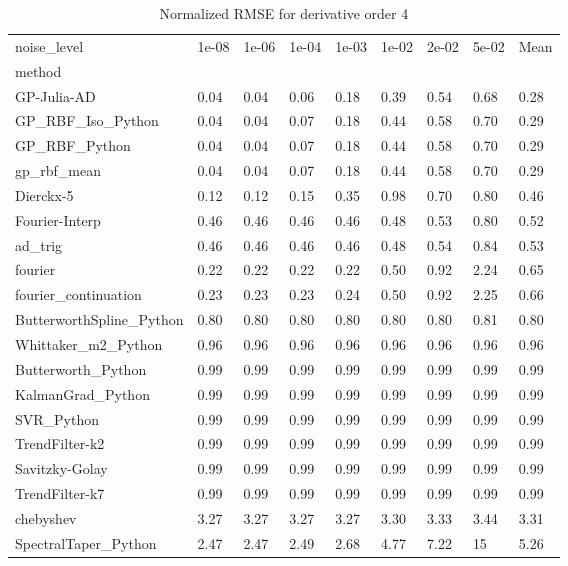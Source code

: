 \begin{table}
\caption{Normalized RMSE for derivative order 4}
\label{tab:nrmse_order_4}
\begin{tabular}{lllllllll}
\toprule
noise_level & 1e-08 & 1e-06 & 1e-04 & 1e-03 & 1e-02 & 2e-02 & 5e-02 & Mean \\
method &  &  &  &  &  &  &  &  \\
\midrule
GP-Julia-AD & 0.04 & 0.04 & 0.06 & 0.18 & 0.39 & 0.54 & 0.68 & 0.28 \\
GP_RBF_Iso_Python & 0.04 & 0.04 & 0.07 & 0.18 & 0.44 & 0.58 & 0.70 & 0.29 \\
GP_RBF_Python & 0.04 & 0.04 & 0.07 & 0.18 & 0.44 & 0.58 & 0.70 & 0.29 \\
gp_rbf_mean & 0.04 & 0.04 & 0.07 & 0.18 & 0.44 & 0.58 & 0.70 & 0.29 \\
Dierckx-5 & 0.12 & 0.12 & 0.15 & 0.35 & 0.98 & 0.70 & 0.80 & 0.46 \\
Fourier-Interp & 0.46 & 0.46 & 0.46 & 0.46 & 0.48 & 0.53 & 0.80 & 0.52 \\
ad_trig & 0.46 & 0.46 & 0.46 & 0.46 & 0.48 & 0.54 & 0.84 & 0.53 \\
fourier & 0.22 & 0.22 & 0.22 & 0.22 & 0.50 & 0.92 & 2.24 & 0.65 \\
fourier_continuation & 0.23 & 0.23 & 0.23 & 0.24 & 0.50 & 0.92 & 2.25 & 0.66 \\
ButterworthSpline_Python & 0.80 & 0.80 & 0.80 & 0.80 & 0.80 & 0.80 & 0.81 & 0.80 \\
Whittaker_m2_Python & 0.96 & 0.96 & 0.96 & 0.96 & 0.96 & 0.96 & 0.96 & 0.96 \\
Butterworth_Python & 0.99 & 0.99 & 0.99 & 0.99 & 0.99 & 0.99 & 0.99 & 0.99 \\
KalmanGrad_Python & 0.99 & 0.99 & 0.99 & 0.99 & 0.99 & 0.99 & 0.99 & 0.99 \\
SVR_Python & 0.99 & 0.99 & 0.99 & 0.99 & 0.99 & 0.99 & 0.99 & 0.99 \\
TrendFilter-k2 & 0.99 & 0.99 & 0.99 & 0.99 & 0.99 & 0.99 & 0.99 & 0.99 \\
Savitzky-Golay & 0.99 & 0.99 & 0.99 & 0.99 & 0.99 & 0.99 & 0.99 & 0.99 \\
TrendFilter-k7 & 0.99 & 0.99 & 0.99 & 0.99 & 0.99 & 0.99 & 0.99 & 0.99 \\
chebyshev & 3.27 & 3.27 & 3.27 & 3.27 & 3.30 & 3.33 & 3.44 & 3.31 \\
SpectralTaper_Python & 2.47 & 2.47 & 2.49 & 2.68 & 4.77 & 7.22 & 15 & 5.26 \\

\end{tabular}
\end{table}
